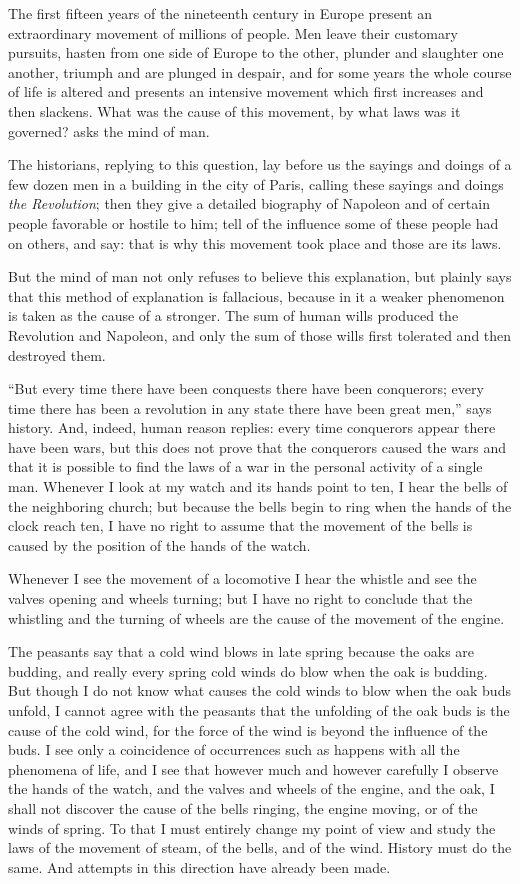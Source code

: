 The first fifteen years of the nineteenth century in Europe
present an extraordinary movement of millions of people. Men
leave their customary pursuits, hasten from one side of Europe to
the other, plunder and slaughter one another, triumph and are
plunged in despair, and for some years the whole course of life
is altered and presents an intensive movement which first
increases and then slackens. What was the cause of this movement,
by what laws was it governed? asks the mind of man.

The historians, replying to this question, lay before us the
sayings and doings of a few dozen men in a building in the city
of Paris, calling these sayings and doings \emph{the Revolution};
then they give a detailed biography of Napoleon and of certain
people favorable or hostile to him; tell of the influence some of
these people had on others, and say: that is why this movement
took place and those are its laws.

But the mind of man not only refuses to believe this explanation,
but plainly says that this method of explanation is fallacious,
because in it a weaker phenomenon is taken as the cause of a
stronger. The sum of human wills produced the Revolution and
Napoleon, and only the sum of those wills first tolerated and
then destroyed them.

``But every time there have been conquests there have been
conquerors; every time there has been a revolution in any state
there have been great men,'' says history. And, indeed, human
reason replies: every time conquerors appear there have been
wars, but this does not prove that the conquerors caused the wars
and that it is possible to find the laws of a war in the personal
activity of a single man. Whenever I look at my watch and its
hands point to ten, I hear the bells of the neighboring church;
but because the bells begin to ring when the hands of the clock
reach ten, I have no right to assume that the movement of the
bells is caused by the position of the hands of the watch.

Whenever I see the movement of a locomotive I hear the whistle
and see the valves opening and wheels turning; but I have no
right to conclude that the whistling and the turning of wheels
are the cause of the movement of the engine.

The peasants say that a cold wind blows in late spring because
the oaks are budding, and really every spring cold winds do blow
when the oak is budding. But though I do not know what causes the
cold winds to blow when the oak buds unfold, I cannot agree with
the peasants that the unfolding of the oak buds is the cause of
the cold wind, for the force of the wind is beyond the influence
of the buds. I see only a coincidence of occurrences such as
happens with all the phenomena of life, and I see that however
much and however carefully I observe the hands of the watch, and
the valves and wheels of the engine, and the oak, I shall not
discover the cause of the bells ringing, the engine moving, or of
the winds of spring. To that I must entirely change my point of
view and study the laws of the movement of steam, of the bells,
and of the wind. History must do the same. And attempts in this
direction have already been made.

